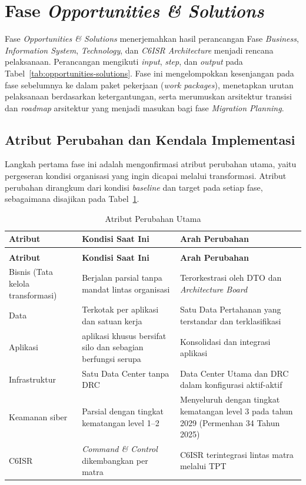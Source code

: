\section{Fase \textit{Opportunities \& Solutions}}

Fase \textit{Opportunities \& Solutions} menerjemahkan hasil perancangan Fase \textit{Business}, \textit{Information System}, \textit{Technology}, dan \textit{C6ISR Architecture} menjadi rencana pelaksanaan. Perancangan mengikuti \textit{input}, \textit{step}, dan \textit{output} pada Tabel~\ref{tab:opportunities-solutions}. Fase ini mengelompokkan kesenjangan pada fase sebelumnya ke dalam paket pekerjaan (\textit{work packages}), menetapkan urutan pelaksanaan berdasarkan ketergantungan, serta merumuskan arsitektur transisi dan \textit{roadmap} arsitektur yang menjadi masukan bagi fase \textit{Migration Planning}.

\subsection{Atribut Perubahan dan Kendala Implementasi}

Langkah pertama fase ini adalah mengonfirmasi atribut perubahan utama, yaitu pergeseran kondisi organisasi yang ingin dicapai melalui transformasi. Atribut perubahan dirangkum dari kondisi \textit{baseline} dan target pada setiap fase, sebagaimana disajikan pada Tabel~\ref{tab:d4-37}.

\begin{longtable}{@{}>{\raggedright\arraybackslash}p{}>{\raggedright\arraybackslash}p{}>{\raggedright\arraybackslash}p{}@{}}
\caption{Atribut Perubahan Utama}
\label{tab:d4-37}\\
\toprule
\textbf{Atribut} & \textbf{Kondisi Saat Ini} & \textbf{Arah Perubahan}\\
\midrule
\endfirsthead
\multicolumn{3}{@{}l}{\small\itshape \tablename\ \thetable{} (lanjutan)}\\
\toprule
\textbf{Atribut} & \textbf{Kondisi Saat Ini} & \textbf{Arah Perubahan}\\
\midrule
\endhead
\bottomrule
\endlastfoot
Bisnis (Tata kelola transformasi) & Berjalan parsial tanpa mandat lintas organisasi & Terorkestrasi oleh DTO dan \textit{Architecture Board}\\
Data & Terkotak per aplikasi dan satuan kerja & Satu Data Pertahanan yang terstandar dan terklasifikasi\\
Aplikasi & 71 aplikasi khusus bersifat silo dan sebagian berfungsi serupa & Konsolidasi dan integrasi aplikasi\\
Infrastruktur & Satu Data Center tanpa DRC & Data Center Utama dan DRC dalam konfigurasi aktif-aktif\\
Keamanan siber & Parsial dengan tingkat kematangan level 1–2 & Menyeluruh dengan tingkat kematangan level 3 pada tahun 2029 (Permenhan 34 Tahun 2025)\\
C6ISR & \textit{Command \& Control} dikembangkan per matra & C6ISR terintegrasi lintas matra melalui TPT\\
\end{longtable}

